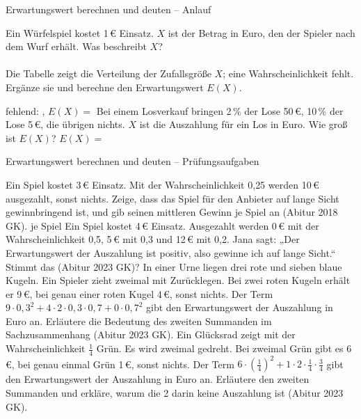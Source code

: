 \setcounter{aufgabe}{26}

\begin{aufgabe}{Erwartungswert berechnen und deuten – Anlauf}
\begin{teile}
\teil Ein Würfelspiel kostet 1\,€ Einsatz. $X$ ist der Betrag in Euro, den der Spieler nach dem Wurf erhält. Was beschreibt $X$? \\  \\ 
\teil Die Tabelle zeigt die Verteilung der Zufallsgröße $X$; eine Wahrscheinlichkeit fehlt. Ergänze sie und berechne den Erwartungswert $E(X)$.

fehlend: \leerfeld , $E(X) = $ \leerfeld
\teil Bei einem Losverkauf bringen 2\,\% der Lose 50\,€, 10\,\% der Lose 5\,€, die übrigen nichts. $X$ ist die Auszahlung für ein Los in Euro. Wie groß ist $E(X)$? $E(X) = $ \leerfeld[€]
\end{teile}
\end{aufgabe}

\begin{aufgabe}{Erwartungswert berechnen und deuten – Prüfungsaufgaben}
\begin{teile}
\teil Ein Spiel kostet 3\,€ Einsatz. Mit der Wahrscheinlichkeit 0{,}25 werden 10\,€ ausgezahlt, sonst nichts. Zeige, dass das Spiel für den Anbieter auf lange Sicht gewinnbringend ist, und gib seinen mittleren Gewinn je Spiel an \hfill (Abitur 2018 GK). \leerfeld[€] je Spiel
\teil Ein Spiel kostet 4\,€ Einsatz. Ausgezahlt werden 0\,€ mit der Wahrscheinlichkeit 0{,}5, 5\,€ mit 0{,}3 und 12\,€ mit 0{,}2. Jana sagt: „Der Erwartungswert der Auszahlung ist positiv, also gewinne ich auf lange Sicht.“ Stimmt das \hfill (Abitur 2023 GK)?
\teil In einer Urne liegen drei rote und sieben blaue Kugeln. Ein Spieler zieht zweimal mit Zurücklegen. Bei zwei roten Kugeln erhält er 9\,€, bei genau einer roten Kugel 4\,€, sonst nichts. Der Term $9 \cdot 0{,}3^2 + 4 \cdot 2 \cdot 0{,}3 \cdot 0{,}7 + 0 \cdot 0{,}7^2$ gibt den Erwartungswert der Auszahlung in Euro an. Erläutere die Bedeutung des zweiten Summanden im Sachzusammenhang \hfill (Abitur 2023 GK).
\teil Ein Glücksrad zeigt mit der Wahrscheinlichkeit $\frac{1}{4}$ Grün. Es wird zweimal gedreht. Bei zweimal Grün gibt es 6\,€, bei genau einmal Grün 1\,€, sonst nichts. Der Term $6 \cdot \left(\frac{1}{4}\right)^2 + 1 \cdot 2 \cdot \frac{1}{4} \cdot \frac{3}{4}$ gibt den Erwartungswert der Auszahlung in Euro an. Erläutere den zweiten Summanden und erkläre, warum die 2 darin keine Auszahlung ist \hfill (Abitur 2023 GK).
\end{teile}
\end{aufgabe}

